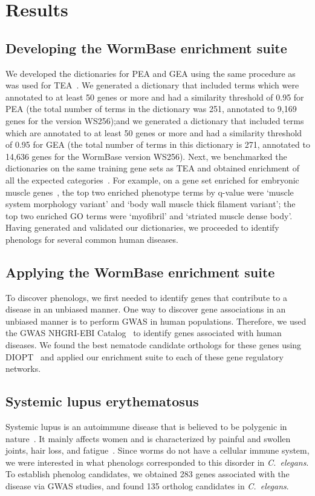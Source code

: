 \documentclass[10pt, onecolumn]{article}
\newcommand{\cel}{\emph{C.~elegans}}
\newcommand{\hlupus}{283}
\newcommand{\wlupus}{135}
\begin{document}
\section*{Results}
\subsection*{Developing the WormBase enrichment suite}
We developed the dictionaries for PEA and GEA using the same procedure as was
used for TEA~\cite{Angeles-Albores2016}. We generated a dictionary that included
terms which were annotated to at least 50 genes or more and had a similarity threshold
of 0.95 for PEA (the total number of terms in the dictionary was 251, annotated
to 9,169 genes for the version WS256);\@ and we generated a dictionary that
included terms which are annotated to at least 50 genes or more and had a similarity
threshold of 0.95 for GEA (the total number of terms in this dictionary is 271,
annotated to 14,636 genes for the WormBase version WS256). \@ Next, we benchmarked the
dictionaries on the same training gene sets as TEA and obtained enrichment of all the
expected categories~\cite{Gaudet2004a, Spencer2011, Cinar2005, Watson2008a,
Pauli2006, Portman2004, Fox2007, Smith2010}. For example, on a gene set enriched
for embryonic muscle genes~\cite{Watson2008a}, the top two enriched phenotype
terms by q-value were `muscle system morphology variant' and `body wall muscle
thick filament variant'; the top two enriched GO terms were `myofibril' and
`striated muscle dense body'. Having generated and validated our dictionaries,
we proceeded to identify phenologs for several common human diseases.

\subsection*{Applying the WormBase enrichment suite}
To discover phenologs, we first needed to identify genes that contribute to a
disease in an unbiased manner. One way to discover gene associations in an
unbiased manner is to perform GWAS in human populations. Therefore, we used the
GWAS NHGRI-EBI Catalog~\cite{MacArthur2016} to identify genes associated with
human diseases. We found the best nematode candidate orthologs for these genes
using DIOPT~\cite{Hu2011} and applied our enrichment suite to each of these gene
regulatory networks.

\subsection*{Systemic lupus erythematosus}
Systemic lupus is an autoimmune disease that is believed to be polygenic in
nature~\cite{Mohan2015}. It mainly affects women and is characterized by painful
and swollen joints, hair loss, and fatigue~\cite{Lisnevskaia2014}. Since worms
do not have a cellular immune system, we were interested in what phenologs
corresponded to this disorder in \cel{}. To establish phenolog candidates, we
obtained \hlupus{} genes associated with the disease via GWAS studies, and found
\wlupus{} ortholog candidates in \cel{}.
\end{document}
